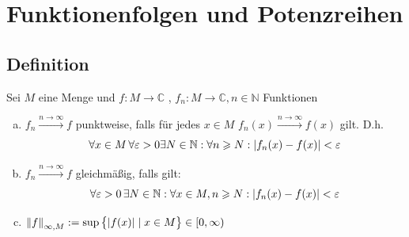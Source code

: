 
\newcommand{\fach}{Analysis \RM{2}.}
\newcommand{\semester}{SoSe 2013}
\newcommand{\homepage}{http://wwwmath.uni-muenster.de/u/wilhelm.winter/wwinter/analysis_II.html}
\newcommand{\prof}{Prof.\,Dr.\,Wilhelm Winter}




\maketitle
\begin{abstract}

\end{abstract}

\tableofcontents
\cleardoubleoddemptypage
{}
\setcounter{page}{1}


\section{Funktionenfolgen und Potenzreihen} %
\label{sec:funktionenfolgen_und_potenzreihen}

\subsection[Definition Konvergenz von Funktionenfolgen]{Definition} %
\label{sub:11}
Sei $M$ eine Menge und $f : M \to \mathds{C}$ , $f_n : M \to \mathds{C}, n \in \mathds{N} $ Funktionen 
\begin{enumerate}[a)]
	\item $f_n \xrightarrow{n \to \infty} f$ punktweise, falls für jedes $x \in M$ $f_n(x) \xrightarrow{n \to \infty} f(x)$ gilt. D.h.
	\[
		\forall x \in M \, \forall \varepsilon > 0 \exists N \in \mathds{N} : \forall n \ge N : \abs*{f_n(x) - f(x)} < \varepsilon
	\]
	\item $f_n \xrightarrow{n \to \infty} f$ gleichmäßig, falls gilt: 
	\[
		\forall \varepsilon >0 \, \exists N \in \mathds{N} : \forall x \in M , n \ge N : \abs*{f_n(x) - f(x)} < \varepsilon
	\]
	\item $\norm[\infty, M]{f} := \sup \big\{ \abs*{f(x)} \mid x \in M \big\} \in [0, \infty)$
\end{enumerate}

